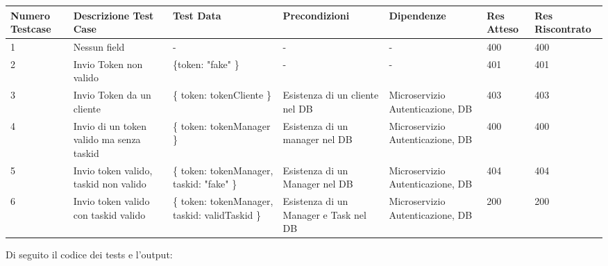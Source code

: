 \documentclass{report}
\begin{document}
\begin{center} %
	\centering
	\begin{tabular}{ |p{1cm}|p{2cm}|p{2cm}|p{2cm}|p{2cm}|p{1cm}|p{1cm}| }
		\hline
		Numero Testcase & Descrizione Test Case                    & Test Data                                      & Precondizioni                         & Dipendenze                       & Res Atteso & Res Riscontrato \\
		\hline
		1               & Nessun field                             & -                                              & -                                     & -                                & 400        & 400             \\
		\hline
		2               & Invio Token non valido                   & \{token: "fake" \}                             & -                                     & -                                & 401        & 401             \\
		\hline
		3               & Invio Token da un cliente                & \{ token: tokenCliente \}                      & Esistenza di un cliente nel DB        & Microservizio Autenticazione, DB & 403        & 403             \\
		\hline
		4               & Invio di un token valido ma senza taskid & \{ token: tokenManager \}                      & Esistenza di un manager nel DB        & Microservizio Autenticazione, DB & 400        & 400             \\
		\hline
		5               & Invio token valido, taskid non valido    & \{ token: tokenManager, taskid: "fake" \}      & Esistenza di un Manager nel DB        & Microservizio Autenticazione, DB & 404        & 404             \\
		\hline
		6               & Invio token valido con taskid valido     & \{ token: tokenManager, taskid: validTaskid \} & Esistenza di un Manager e Task nel DB & Microservizio Autenticazione, DB & 200        & 200             \\
		\hline
	\end{tabular}
\end{center}

Di seguito il codice dei tests e l'output:
\end{document}
